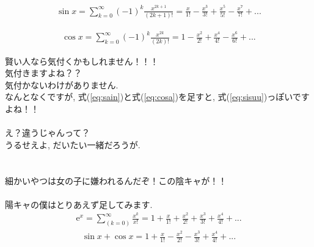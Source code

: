 \documentclass[11pt,a4paper]{jsarticle}
\begin{document}
\begin{eqnarray}
\sin x = \sum_{k=0}^{\infty}(-1)^k \frac{x^{2k + 1}}{(2k + 1)!} = \frac{x}{1!} - \frac{x^3}{3!} + \frac{x^5}{5!} - \frac{x^7}{7!} +  ...
\label{eq:sain}
\end{eqnarray}

\begin{eqnarray}
\cos x = \sum_{k=0}^\infty(-1)^k \frac{x^{2k}}{(2k)!} = 1 - \frac{x^2}{2!} + \frac{x^4}{4!} - \frac{x^6}{6!} + ...
\label{eq:cosa}
\end{eqnarray}

賢い人なら気付くかもしれません！！！\\
気付きますよね？？\\
気付かないわけがありません.\\
なんとなくですが, 式(\ref{eq:sain})と式(\ref{eq:cosa})を足すと, 式(\ref{eq:sisuu})っぽいですよね！！\\
\\
え？違うじゃんって？\\
うるせえよ, だいたい一緒だろうが.\\
\\
\\
細かいやつは女の子に嫌われるんだぞ！この陰キャが！！\\
\\
陽キャの僕はとりあえず足してみます.
\\
\begin{eqnarray}
\mathrm{e}^x = \sum_{(k=0)}^\infty \frac{x^k}{x!} = 1 + \frac{x}{1!} + \frac{x^2}{2!} + \frac{x^3}{3!} + \frac{x^4}{4!} + ...
\end{eqnarray}
\begin{eqnarray}
\sin x + \cos x = 1 + \frac{x}{1!} - \frac{x^2}{2!} - \frac{x^3}{3!} + \frac{x^4}{4!} + ...
\label{eq:mix}
\end{eqnarray}
\end{document}
